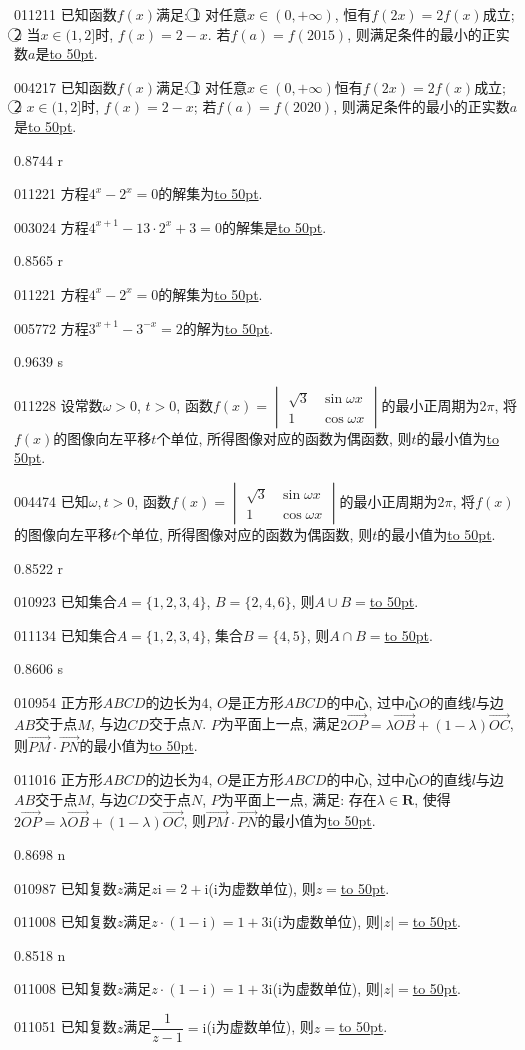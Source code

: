 \documentclass[10pt,a4paper]{article}
\newcommand{\blank}[1]{\underline{\hbox to #1pt{}}}
\begin{document}
011211	已知函数$f(x)$满足: \textcircled{1} 对任意$x\in (0, +\infty)$, 恒有$f(2x)=2f(x)$成立; \textcircled{2} 当$x\in (1,2]$时, $f(x)=2-x$. 若$f(a)=f(2015)$, 则满足条件的最小的正实数$a$是\blank{50}.

004217	已知函数$f(x)$满足: \textcircled{1} 对任意$x\in (0,+\infty)$恒有$f(2x)=2f(x)$成立; \textcircled{2} $x\in (1,2]$时, $f(x)=2-x$; 若$f(a)=f(2020)$, 则满足条件的最小的正实数$a$是\blank{50}.

0.8744 r

011221	方程$4^x-2^x=0$的解集为\blank{50}.

003024	方程$4^{x+1}-13\cdot 2^x+3=0$的解集是\blank{50}.

0.8565 r

011221	方程$4^x-2^x=0$的解集为\blank{50}.

005772	方程$3^{x+1}-3^{-x}=2$的解为\blank{50}.

0.9639 s

011228	设常数$\omega >0$, $t>0$, 函数$f(x)=\begin{vmatrix}
\sqrt 3 & \sin \omega x  \\ 1 & \cos \omega x  \end{vmatrix}$的最小正周期为$2\pi$, 将$f(x)$的图像向左平移$t$个单位, 所得图像对应的函数为偶函数, 则$t$的最小值为\blank{50}.

004474	已知$\omega,t>0$, 函数$f(x)=\begin{vmatrix}
\sqrt 3 & \sin \omega x  \\ 1  & \cos \omega x  \end{vmatrix}$的最小正周期为$2\pi$, 将$f(x)$的图像向左平移$t$个单位, 所得图像对应的函数为偶函数, 则$t$的最小值为\blank{50}.

0.8522 r

010923	已知集合$A=\{1,2,3,4\}$, $B=\{2,4,6\}$, 则$A\cup B=$\blank{50}.

011134	已知集合$A=\{1,2,3,4\}$, 集合$B=\{4,5\}$, 则$A\cap B=$\blank{50}.

0.8606 s

010954	正方形$ABCD$的边长为$4$, $O$是正方形$ABCD$的中心, 过中心$O$的直线$l$与边$AB$交于点$M$, 与边$CD$交于点$N$. $P$为平面上一点, 满足$2
\overrightarrow{OP}=\lambda \overrightarrow{OB}+(1-\lambda)\overrightarrow{OC}$, 则$\overrightarrow{PM}\cdot \overrightarrow{PN}$的最小值为\blank{50}.

011016	正方形$ABCD$的边长为$4$, $O$是正方形$ABCD$的中心, 过中心$O$的直线$l$与边$AB$交于点$M$, 与边$CD$交于点$N$, $P$为平面上一点, 满足: 存在$\lambda\in \mathbf{R}$, 使得$2\overrightarrow{OP}=\lambda \overrightarrow{OB}+(1-\lambda)\overrightarrow{OC}$, 则$\overrightarrow{PM}\cdot \overrightarrow{PN}$的最小值为\blank{50}.

0.8698 n

010987	已知复数$z$满足$z\mathrm{i}=2+\mathrm{i}$($\mathrm{i}$为虚数单位), 则$z=$\blank{50}.

011008	已知复数$z$满足$z\cdot (1-\mathrm{i})=1+3\mathrm{i}$($\mathrm{i}$为虚数单位), 则$|z|=$\blank{50}.

0.8518 n

011008	已知复数$z$满足$z\cdot (1-\mathrm{i})=1+3\mathrm{i}$($\mathrm{i}$为虚数单位), 则$|z|=$\blank{50}.

011051	已知复数$z$满足$\dfrac 1{z-1}=\mathrm{i}$($\mathrm{i}$为虚数单位), 则$z=$\blank{50}.
\end{document}
